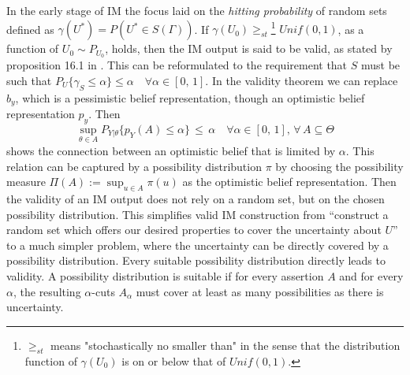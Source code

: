 \documentclass[
]{report}
\theoremstyle{definition}
\theoremstyle{definition}
\begin{document}
In the early stage of IM the focus laid on the
\textit{hitting probability} of random sets defined as
\(\gamma(U^*) = P(U^* \in S(\Gamma))\). If
\(\gamma(U_0) \geq_{st}\)\footnote{$\geq_{st}$ means "stochastically no smaller than" in the sense that the distribution function of $\gamma (U_0)$ is on or below that of $Unif(0,1)$.}
\(Unif(0,1)\), as a function of \(U_0 \sim P_{U_0}\), holds, then the IM
output is said to be valid, as stated by proposition 16.1 in
\cite{berger_handbook_2024}. This can be reformulated to the requirement
that \(S\) must be such that
\(P_U \{\gamma_S \leq \alpha \} \leq \alpha \quad \forall \alpha \in [0, \, 1]\).
In the validity theorem we can replace \(b_y\), which is a pessimistic
belief representation, though an optimistic belief representation
\(p_y\). Then
\[\sup_{\theta \in A} P_{Y | \theta} \{p_Y (A) \leq \alpha \} \, \leq \, \alpha \quad \forall \alpha \in [0, \, 1], \, \forall \, A \subseteq \Theta\]
shows the connection between an optimistic belief that is limited by
\(\alpha\). This relation can be captured by a possibility distribution
\(\pi\) by choosing the possibility measure
\(\Pi(A) := \sup_{u \in A} \pi (u)\) as the optimistic belief
representation. Then the validity of an IM output does not rely on a
random set, but on the chosen possibility distribution. This simplifies
valid IM construction from ``construct a random set which offers our
desired properties to cover the uncertainty about \(U\)'' to a much
simpler problem, where the uncertainty can be directly covered by a
possibility distribution. Every suitable possibility distribution
directly leads to validity. A possibility distribution is suitable if
for every assertion \(A\) and for every \(\alpha\), the resulting
\(\alpha\)-cuts \(A_\alpha\) must cover at least as many possibilities
as there is uncertainty.


\printbibliography
\end{document}
